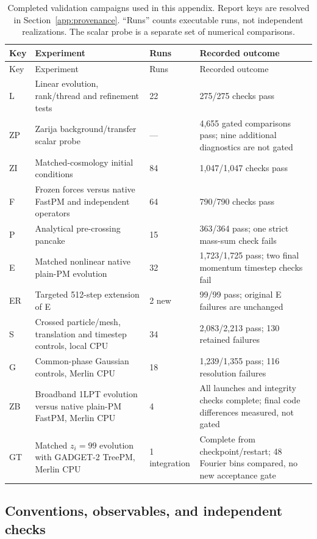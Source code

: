 \begin{longtable}{@{}p{}p{}p{}p{}@{}}
\caption{Completed validation campaigns used in this appendix.  Report keys
are resolved in Section~\ref{app:provenance}.  ``Runs'' counts executable runs,
not independent realizations.  The scalar probe is a separate set of numerical
comparisons.}\label{tab:app-campaigns}\\
\toprule
Key & Experiment & Runs & Recorded outcome \\
\midrule
\endfirsthead
\toprule Key & Experiment & Runs & Recorded outcome \\
\midrule
\endhead
L & Linear evolution, rank/thread and refinement tests & 22 & 275/275 checks pass \\
ZP & Zarija background/transfer scalar probe & --- & 4,655 gated comparisons pass;
  nine additional diagnostics are not gated \\
ZI & Matched-cosmology initial conditions & 84 & 1,047/1,047 checks pass \\
F & Frozen forces versus native FastPM and independent operators & 64 &
  790/790 checks pass \\
P & Analytical pre-crossing pancake & 15 & 363/364 pass;
  one strict mass-sum check fails \\
E & Matched nonlinear native plain-PM evolution & 32 & 1,723/1,725 pass;
  two final momentum timestep checks fail \\
ER & Targeted 512-step extension of E & 2 new & 99/99 pass;
  original E failures are unchanged \\
S & Crossed particle/mesh, translation and timestep controls, local CPU & 34 &
  2,083/2,213 pass; 130 retained failures \\
G & Common-phase Gaussian controls, Merlin CPU & 18 &
  1,239/1,355 pass; 116 resolution failures \\
ZB & Broadband 1LPT evolution versus native plain-PM FastPM, Merlin CPU & 4 &
  All launches and integrity checks complete; final code differences measured, not gated \\
GT & Matched $z_i=99$ evolution with GADGET-2 TreePM, Merlin CPU & 1 integration &
  Complete from checkpoint/restart; 48 Fourier bins compared, no new acceptance gate \\
\bottomrule
\end{longtable}

\subsection{Conventions, observables, and independent checks}
\label{app:metrics}

